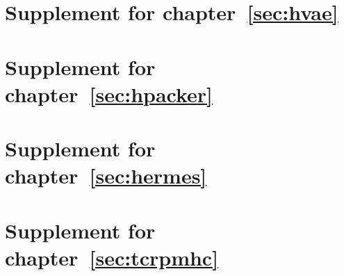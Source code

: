 \documentclass[12pt, english]{uw_thesis}
\begin{document}
\appendix
{}
\setcounter{table}{0}
\setcounter{figure}{0}
\setcounter{equation}{0}


\chapter{Supplement for chapter~\ref{sec:hvae}}
\label{sec:hvae_appendix}

\clearpage


\chapter{Supplement for chapter~\ref{sec:hpacker}}
\label{sec:hpacker_appendix}

\clearpage


\chapter{Supplement for chapter~\ref{sec:hermes}}
\label{sec:hermes_appendix}

\clearpage


\chapter{Supplement for chapter~\ref{sec:tcrpmhc}}
\label{sec:tcrpmhc_appendix}

\clearpage

\end{document}

